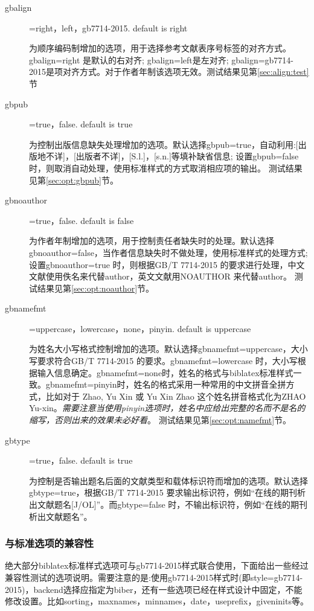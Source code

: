 \begin{description}
  \item[gbalign]=right，left，gb7714-2015. \hfill default is right

  为顺序编码制增加的选项，用于选择参考文献表序号标签的对齐方式。gbalign=right 是默认的右对齐; gbalign=left是左对齐; gbalign=gb7714-2015是项对齐方式。对于作者年制该选项无效。测试结果见第\ref{sec:align:test}节

  \item[gbpub]=true，false. \hfill default is true

  为控制出版信息缺失处理增加的选项。默认选择gbpub=true，自动利用:[出版地不详]，[出版者不详]，[S.l.]，[s.n.]等填补缺省信息; 设置gbpub=false 时，则取消自动处理，使用标准样式的方式取消相应项的输出。
  测试结果见第\ref{sec:opt:gbpub}节。

  \item[gbnoauthor]=true，false. \hfill default is false

  为作者年制增加的选项，用于控制责任者缺失时的处理。默认选择gbnoauthor=false，当作者信息缺失时不做处理，使用标准样式的处理方式; 设置gbnoauthor=true 时，则根据GB/T 7714-2015 的要求进行处理，中文文献使用佚名来代替author，英文文献用NOAUTHOR 来代替author。
  测试结果见第\ref{sec:opt:noauthor}节。

  \item[gbnamefmt]=uppercase，lowercase，none，pinyin. \hfill default is uppercase

  为姓名大小写格式控制增加的选项。默认选择gbnamefmt=uppercase，大小写要求符合GB/T 7714-2015 的要求。gbnamefmt=lowercase 时，大小写根据输入信息确定。gbnamefmt=none时，姓名的格式与biblatex标准样式一致。gbnamefmt=pinyin时，姓名的格式采用一种常用的中文拼音全拼方式，比如对于 Zhao, Yu Xin 或 Yu Xin Zhao 这个姓名拼音格式化为ZHAO Yu-xin。\emph{需要注意当使用pinyin选项时，姓名中应给出完整的名而不是名的缩写，否则出来的效果未必好看}。
  测试结果见第\ref{sec:opt:namefmt}节。

  \item[gbtype]=true，false. \hfill default is true

  为控制是否输出题名后面的文献类型和载体标识符而增加的选项。默认选择gbtype=true，根据GB/T 7714-2015 要求输出标识符，例如“在线的期刊析出文献题名[J/OL]”。而gbtype=false 时，不输出标识符，例如“在线的期刊析出文献题名”。
\end{description}


\subsubsection{与标准选项的兼容性}
绝大部分biblatex标准样式选项可与gb7714-2015样式联合使用，下面给出一些经过兼容性测试的选项说明。需要注意的是:使用gb7714-2015样式时(即style=gb7714-2015)，backend选择应指定为biber，还有一些选项已经在样式设计中固定，不能修改设置。比如sorting，maxnames，minnames，date，useprefix，giveninits等。


